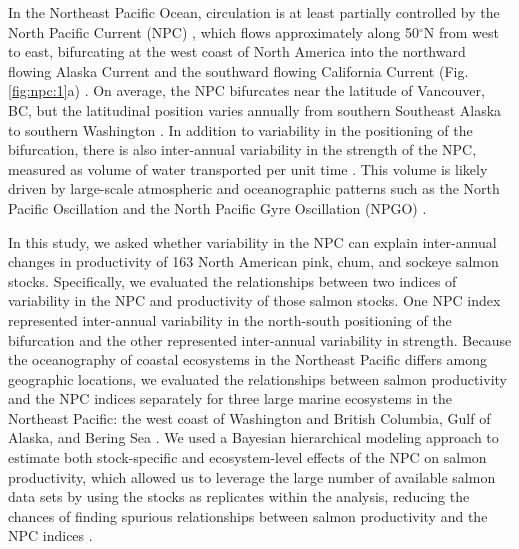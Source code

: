 In the Northeast Pacific Ocean, circulation is at least partially controlled by
the North Pacific Current (NPC) \citep{Ware1989a, Cummins2007a}, which flows
approximately along 50$^{\circ}$N from west to east, bifurcating at the west
coast of North America into the northward flowing Alaska Current and the
southward flowing California Current (Fig. \ref{fig:npc:1}a) \citep{Ware1989a,
Chelton1982a}. On average, the NPC bifurcates near the latitude of Vancouver,
BC, but the latitudinal position varies annually from southern Southeast Alaska
to southern Washington \citep{Cummins2007a, Sydeman2011a}. In addition to
variability in the positioning of the bifurcation, there is also inter-annual
variability in the strength of the NPC, measured as volume of water transported
per unit time \citep{Freeland2006a, Cummins2007a}. This volume is likely driven
by large-scale atmospheric and oceanographic patterns such as the North Pacific
Oscillation and the North Pacific Gyre Oscillation (NPGO)
\citep{Di-Lorenzo2008a}.

In this study, we asked whether variability in the NPC can explain inter-annual
changes in productivity of 163 North American pink, chum, and sockeye salmon
stocks. Specifically, we evaluated the relationships between two indices of
variability in the NPC and productivity of those salmon stocks. One NPC index
represented inter-annual variability in the north-south positioning of the
bifurcation and the other represented inter-annual variability in strength.
Because the oceanography of coastal ecosystems in the Northeast Pacific differs
among geographic locations, we evaluated the relationships between salmon
productivity and the NPC indices separately for three large marine ecosystems in
the Northeast Pacific: the west coast of Washington and British Columbia, Gulf
of Alaska, and Bering Sea \citep{Sherman1999, Longhurst1995}. We used a Bayesian
hierarchical modeling approach to estimate both stock-specific and
ecosystem-level effects of the NPC on salmon productivity, which allowed us to
leverage the large number of available salmon data sets by using the stocks as
replicates within the analysis, reducing the chances of finding spurious
relationships between salmon productivity and the NPC indices \citep{Myers1998c,
Thorson2015b, Mueter2002a}.

